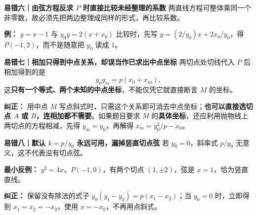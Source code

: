 \begin{trapbox}
\medskip
\textbf{\textcolor{CTrap}{易错六｜由弦方程反求 $P$ 时直接比较未经整理的系数}}
两直线方程可整体乘同一个非零数，故必须先把两边整理成同样的形式，再比较系数。
\par\textbf{例：} $y=x-1$ 与 $y_0y=2(x+x_0)$ 比较时，先写 $y=(2/y_0)x+2x_0/y_0$，得 $P(-1,2)$，而不是随意把 $y_0$ 读成 $1$。

\medskip
\textbf{\textcolor{CTrap}{易错七｜相加只得到中点关系，却误当作已求出中点坐标}}
两切点处切线代入 $P$ 后相加得到的是
\[y_0y_m=p(x_0+x_m),\]
这\textbf{只有一个等式、两个未知的中点坐标}，不能仅凭它就直接断言 $M$ 的坐标。
\par\textbf{纠正：} 用中点 $M$ 写点斜式时，只需这个关系即可消去中点坐标；\textbf{也可以直接选切点 $A$ 或 $B$，连相加都不需要}。如果题目要求 $M$ 的\textbf{具体坐标}，还应利用抛物线上两切点的方程相减，先得 $y_m=y_0$，再解得 $x_m=y_0^2/p-x_0$。

\medskip
\textbf{\textcolor{CTrap}{易错八｜默认 $k=p/y_0$ 永远可用，漏掉竖直切点弦}}
若 $y_0=0$，斜率式 $p/y_0$ 无意义，这不代表没有切点弦。
\par\textbf{最小反例：} $y^2=4x$、$P(-1,0)$，有两个切点 $(1,\pm 2)$，弦是 $x=1$，恰为竖直直线。
\par\textbf{纠正：} 保留没有除法的式子 $y_0(y_1-y_2)=p(x_1-x_2)$；当 $y_0=0$ 时，立即得到 $x_1=x_2=-x_0$，使用 $x=-x_0$，不再用点斜式。
\end{trapbox}
